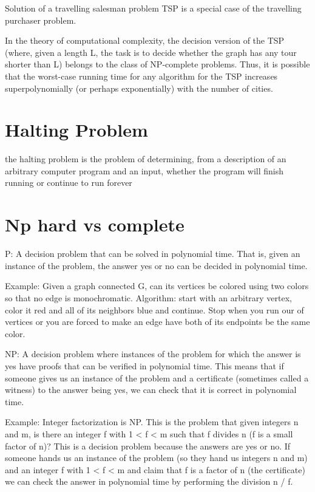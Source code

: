 \documentclass[10 pt]{article}
\begin{document}
Solution of a travelling salesman problem
TSP is a special case of the travelling purchaser problem.

In the theory of computational complexity, the decision version of the TSP (where, given a length L, the task is to decide whether the graph has any tour shorter than L) belongs to the class of NP-complete problems. Thus, it is possible that the worst-case running time for any algorithm for the TSP increases superpolynomially (or perhaps exponentially) with the number of cities.

\section{Halting Problem}
the halting problem is the problem of determining, from a description of an arbitrary computer program and an input, whether the program will finish running or continue to run forever

\section{Np hard vs complete}
P: A decision problem that can be solved in polynomial time. That is, given an instance of the problem, the answer yes or no can be decided in polynomial time.

Example: Given a graph connected G, can its vertices be colored using two colors so that no edge is monochromatic. Algorithm: start with an arbitrary vertex, color it red and all of its neighbors blue and continue. Stop when you run our of vertices or you are forced to make an edge have both of its endpoints be the same color.

NP: A decision problem where instances of the problem for which the answer is yes have proofs that can be verified in polynomial time. This means that if someone gives us an instance of the problem and a certificate (sometimes called a witness) to the answer being yes, we can check that it is correct in polynomial time.

Example: Integer factorization is NP. This is the problem that given integers n and m, is there an integer f with 1 < f < m such that f divides n (f is a small factor of n)? This is a decision problem because the answers are yes or no. If someone hands us an instance of the problem (so they hand us integers n and m) and an integer f with 1 < f < m and claim that f is a factor of n (the certificate) we can check the answer in polynomial time by performing the division n / f.
\end{document}
